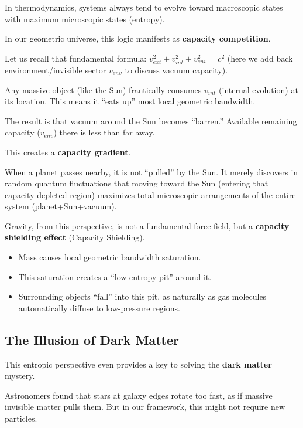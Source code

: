 \documentclass[11pt,a4paper,twoside]{book}
\begin{document}
In thermodynamics, systems always tend to evolve toward macroscopic states with maximum microscopic states (entropy).

In our geometric universe, this logic manifests as \textbf{capacity competition}.

Let us recall that fundamental formula: $v_{ext}^2 + v_{int}^2 + v_{env}^2 = c^2$ (here we add back environment/invisible sector $v_{env}$ to discuss vacuum capacity).

Any massive object (like the Sun) frantically consumes $v_{int}$ (internal evolution) at its location. This means it ``eats up'' most local geometric bandwidth.

The result is that vacuum around the Sun becomes ``barren.'' Available remaining capacity ($v_{env}$) there is less than far away.

This creates a \textbf{capacity gradient}.

When a planet passes nearby, it is not ``pulled'' by the Sun. It merely discovers in random quantum fluctuations that moving toward the Sun (entering that capacity-depleted region) maximizes total microscopic arrangements of the entire system (planet+Sun+vacuum).

Gravity, from this perspective, is not a fundamental force field, but a \textbf{capacity shielding effect} (Capacity Shielding).

\begin{itemize}
\item Mass causes local geometric bandwidth saturation.

\item This saturation creates a ``low-entropy pit'' around it.

\item Surrounding objects ``fall'' into this pit, as naturally as gas molecules automatically diffuse to low-pressure regions.
\end{itemize}

\subsection{The Illusion of Dark Matter}

This entropic perspective even provides a key to solving the \textbf{dark matter} mystery.

Astronomers found that stars at galaxy edges rotate too fast, as if massive invisible matter pulls them. But in our framework, this might not require new particles.
\end{document}
